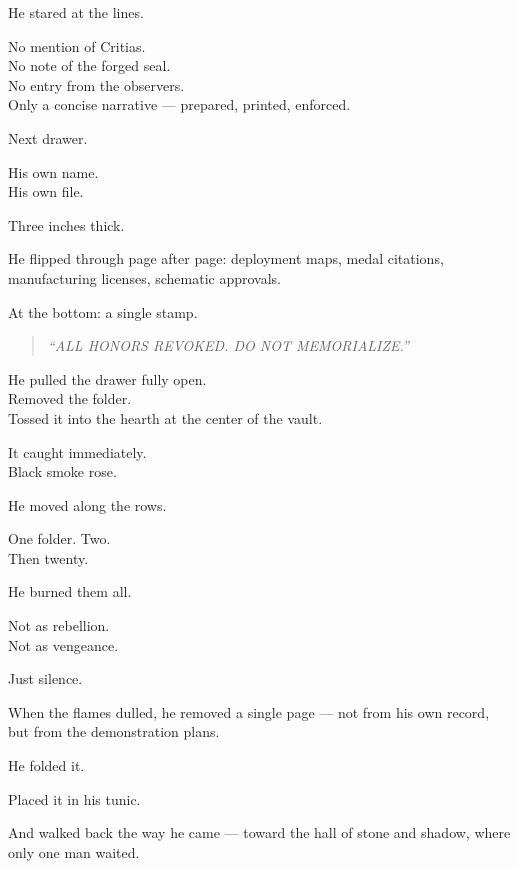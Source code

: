 \documentclass[12pt]{article}
\begin{document}
\vspace{1em}

He stared at the lines.

No mention of Critias.\\
No note of the forged seal.\\
No entry from the observers.\\
Only a concise narrative — prepared, printed, enforced.

\vspace{1em}

Next drawer.

His own name.\\
His own file.

Three inches thick.

He flipped through page after page: deployment maps, medal citations, manufacturing licenses, schematic approvals.

At the bottom: a single stamp.

\begin{quote}
\textit{“ALL HONORS REVOKED. DO NOT MEMORIALIZE.”}
\end{quote}

\vspace{1em}

He pulled the drawer fully open.\\
Removed the folder.\\
Tossed it into the hearth at the center of the vault.

It caught immediately.\\
Black smoke rose.

\vspace{1em}

He moved along the rows.

One folder. Two.\\
Then twenty.

He burned them all.

Not as rebellion.\\
Not as vengeance.

Just silence.

\vspace{1em}

When the flames dulled, he removed a single page — not from his own record, but from the demonstration plans.

He folded it.

Placed it in his tunic.

And walked back the way he came — toward the hall of stone and shadow, where only one man waited.
\end{document}
